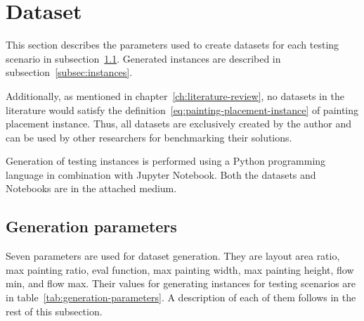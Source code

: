 \section{Dataset}\label{sec:dataset}

This section describes the parameters used to create datasets for each testing scenario in subsection~\ref{subsec:generation-parameters}.
Generated instances are described in subsection~\ref{subsec:instances}.

Additionally, as mentioned in chapter~\ref{ch:literature-review}, no datasets in the
literature would satisfy the definition~\ref{eq:painting-placement-instance} of painting placement instance.
Thus, all datasets are exclusively created by the author and can be used by other researchers
for benchmarking their solutions.

Generation of testing instances is performed using a Python programming language in combination with Jupyter Notebook.
Both the datasets and Notebooks are in the attached medium.

\subsection{Generation parameters}\label{subsec:generation-parameters}

Seven parameters are used for dataset generation.
They are layout area ratio, max painting ratio, eval function, max painting width, max painting height, flow min, and flow max.
Their values for generating instances for testing scenarios are in table~\ref{tab:generation-parameters}.
A description of each of them follows in the rest of this subsection.

